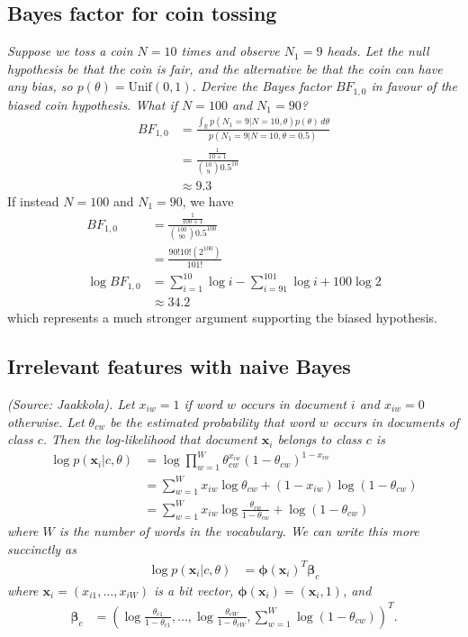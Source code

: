 \subsection{Bayes factor for coin tossing}
\textit{Suppose we toss a coin $N=10$ times and observe $N_1=9$ heads. Let the null hypothesis be that the coin is fair, and the alternative be that the coin can have any bias, so $p(\theta)=\text{Unif}(0,1)$. Derive the Bayes factor $BF_{1,0}$ in favour of the biased coin hypothesis. What if $N=100$ and $N_1=90$?}
\begin{align*}
BF_{1,0} &= \frac{\int_{\mathbb{R}} p(N_1=9|N=10,\theta)p(\theta) \,d\theta}{p(N_1=9|N=10,\theta=0.5)}\\
&= \frac{\frac{1}{10+1}}{{10 \choose 9} 0.5^{10}}\\
&\approx 9.3
\end{align*}
If instead $N=100$ and $N_1=90$, we have
\begin{align*}
BF_{1,0} &= \frac{\frac{1}{100+1}}{{100 \choose 90} 0.5^{100}}\\
&= \frac{90!10!(2^{100})}{101!}\\
\log BF_{1,0} &= \sum_{i=1}^{10} \log i - \sum_{i=91}^{101} \log i + 100\log 2\\
&\approx 34.2
\end{align*}
which represents a much stronger argument supporting the biased hypothesis.

\subsection{Irrelevant features with naive Bayes}
\textit{(Source: Jaakkola). Let $x_{iw}=1$ if word $w$ occurs in document $i$ and $x_{iw}=0$ otherwise. Let $\theta_{cw}$ be the estimated probability that word $w$ occurs in documents of class $c$. Then the log-likelihood that document $\bm{x}_i$ belongs to class $c$ is}
\begin{align*}
\log p(\bm{x}_i|c,\theta) &= \log\prod_{w=1}^W \theta_{cw}^{x_{iw}}(1-\theta_{cw})^{1-x_{iw}}\\
&= \sum_{w=1}^W x_{iw}\log\theta_{cw} + (1-x_{iw})\log(1-\theta_{cw})\\
&= \sum_{w=1}^W x_{iw}\log\frac{\theta_{cw}}{1-\theta_{cw}} + \log(1-\theta_{cw})
\end{align*}
\textit{where $W$ is the number of words in the vocabulary. We can write this more succinctly as}
\begin{align*}
\log p(\bm{x}_i|c,\theta) &= \bm\phi(\bm{x}_i)^T\bm\beta_c
\end{align*}
\textit{where $\bm{x}_i = (x_{i1},\dots,x_{iW})$ is a bit vector, $\bm\phi(\bm{x}_i) = (\bm{x}_i, 1)$, and}
\begin{align*}
\bm\beta_c &= \left( \log\frac{\theta_{c1}}{1-\theta_{c1}}, \dots, \log\frac{\theta_{cW}}{1-\theta_{cW}}, \sum_{w=1}^W \log(1-\theta_{cw}) \right)^T.
\end{align*}

